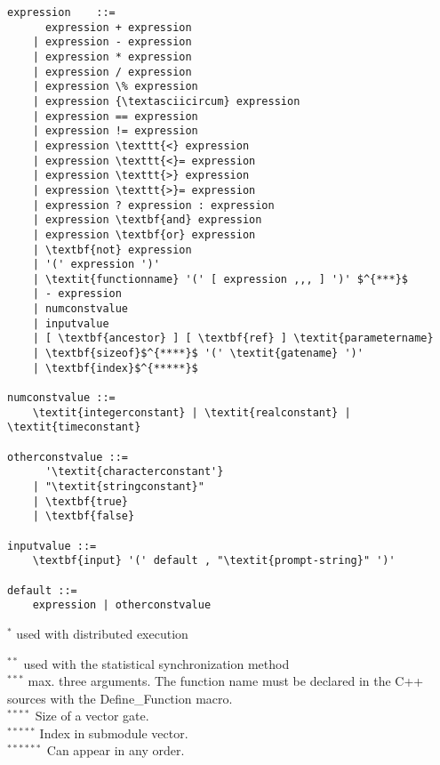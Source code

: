 \begin{Verbatim}[commandchars=\\\{\}]
expression    ::=
      expression + expression
    | expression - expression
    | expression * expression
    | expression / expression
    | expression \% expression
    | expression {\textasciicircum} expression
    | expression == expression
    | expression != expression
    | expression \texttt{<} expression
    | expression \texttt{<}= expression
    | expression \texttt{>} expression
    | expression \texttt{>}= expression
    | expression ? expression : expression
    | expression \textbf{and} expression
    | expression \textbf{or} expression
    | \textbf{not} expression
    | '(' expression ')'
    | \textit{functionname} '(' [ expression ,,, ] ')' $^{***}$
    | - expression
    | numconstvalue
    | inputvalue
    | [ \textbf{ancestor} ] [ \textbf{ref} ] \textit{parametername}
    | \textbf{sizeof}$^{****}$ '(' \textit{gatename} ')'
    | \textbf{index}$^{*****}$

numconstvalue ::=
    \textit{integerconstant} | \textit{realconstant} | \textit{timeconstant}

otherconstvalue ::=
      '\textit{characterconstant'}
    | "\textit{stringconstant}"
    | \textbf{true}
    | \textbf{false}

inputvalue ::=
    \textbf{input} '(' default , "\textit{prompt-string}" ')'

default ::=
    expression | otherconstvalue
\end{Verbatim}


$^{*}$ used with distributed execution


$^{**}$ used with the statistical synchronization method\\
$^{***}$ max. three arguments. The function name must be declared
in the C++ sources with the Define\_Function macro.\\
$^{****}$ Size of a vector gate.\\
$^{*****}$ Index in submodule vector.\\
$^{******}$ Can appear in any order.



